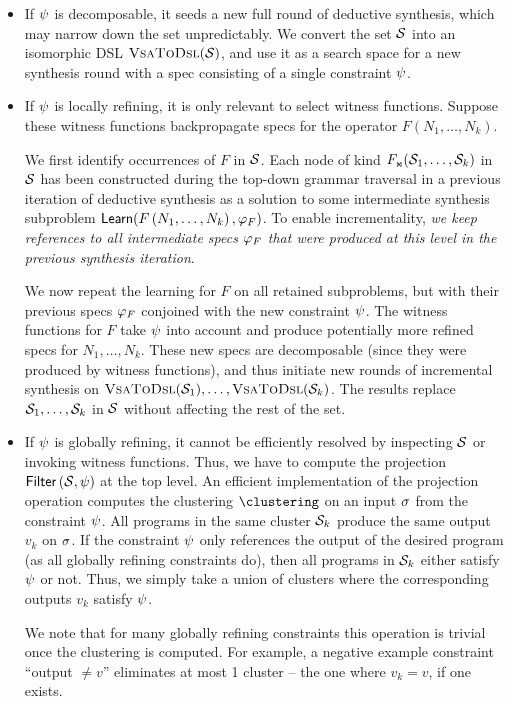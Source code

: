 \begin{itemize}
    \item If $\psi$ is decomposable, it seeds a new full round of deductive synthesis, which may narrow down the
        set unpredictably.
        We convert the set $\mathcal{S}$ into an isomorphic DSL $\text{\textsc{VsaToDsl}}(\mathcal{S})$, and use it as a search space
        for a new synthesis round with a spec consisting of a single constraint $\psi$.
    \item If $\psi$ is locally refining, it is only relevant to select witness functions.
        Suppose these witness functions backpropagate specs for the operator $F(N_1, \dots, N_k)$.

        We first identify occurrences of $F$ in $\mathcal{S}$.
        Each node of kind $F_{\text{\tiny\ensuremath{\Join}}}(\mathcal{S}_1, \dots, \mathcal{S}_k)$ in $\mathcal{S}$ has been constructed during the top-down grammar
        traversal in a previous iteration of deductive synthesis as a solution to some intermediate synthesis subproblem
        $\mathsf{Learn}(F\left(N_1, \dots, N_k\right), \varphi_F)$.
        To enable incrementality, \emph{we keep references to all intermediate specs $\varphi_F$ that were produced at
            this level in the previous synthesis iteration}.

        We now repeat the learning for $F$ on all retained subproblems, but with their previous specs $\varphi_F$
        conjoined with the new constraint $\psi$.
        The witness functions for $F$ take $\psi$ into account and produce potentially more refined specs for
        $N_1, \dots, N_k$.
        These new specs are decomposable (since they were produced by witness functions), and thus initiate new rounds
        of incremental synthesis on $\text{\textsc{VsaToDsl}}(\mathcal{S}_1), \dots, \text{\textsc{VsaToDsl}}(\mathcal{S}_k)$.
        The results replace $\mathcal{S}_1, \dots, \mathcal{S}_k$ in $\mathcal{S}$ without affecting the rest of the set.
    \item If $\psi$ is globally refining, it cannot be efficiently resolved by inspecting $\mathcal{S}$ or invoking
        witness functions.
        Thus, we have to compute the projection $\mathsf{Filter}\left(\mathcal{S}, \psi\right)$ at the top level.
        An efficient implementation of the projection operation computes the clustering $\clustering$ on an input
        $\sigma$ from the constraint $\psi$.
        All programs in the same cluster $\mathcal{S}_k$ produce the same output $v_k$ on $\sigma$.
        If the constraint $\psi$ only references the output of the desired program (as all globally refining
        constraints do), then all programs in $\mathcal{S}_k$ either satisfy $\psi$ or not.
        Thus, we simply take a union of clusters where the corresponding outputs $v_k$ satisfy $\psi$.

        We note that for many globally refining constraints this operation is trivial once the clustering is computed.
        For example, a negative example constraint ``output $\ne v$'' eliminates at most 1 cluster -- the one where $v_k
        = v$, if one exists.
\end{itemize}

